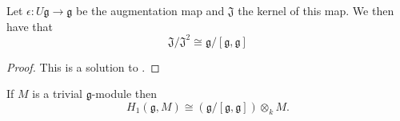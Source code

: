 \begin{lemma}
  Let $ \epsilon: U\mathfrak{g} \to \mathfrak{g} $ be the augmentation map and $ \mathfrak{J} $ the kernel of this map. We then have that
  \begin{equation}
    \mathfrak{J}/\mathfrak{J}^2 \cong \mathfrak{g}/[\mathfrak{g}, \mathfrak{g}]
    \label{eq:abelianization}
  \end{equation}
\end{lemma}
\begin{proof}
  This is a solution to \cite[Exercise 7.4.1]{weibel1994homological}.
\end{proof}

\begin{corollary}
  If $ M $ is a trivial $ \mathfrak{g} $-module then
  \begin{equation}
    H_1(\mathfrak{g}, M) \cong (\mathfrak{g}/[\mathfrak{g}, \mathfrak{g}]) \otimes_k M.
  \end{equation}
\end{corollary}
